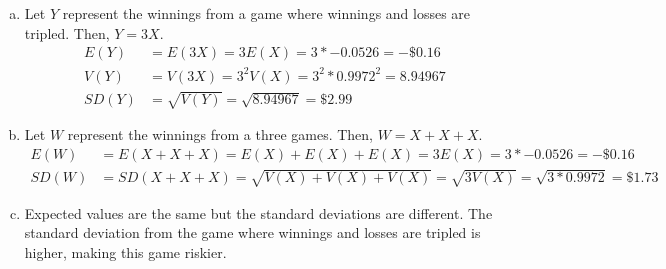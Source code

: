 \pagebreak

{
\begin{enumerate}[(a)]
\setlength{\itemsep}{0mm}
\item Let $Y$ represent the winnings from a game where winnings and losses are tripled. Then, $Y = 3X$.
\begin{align*}
E(Y) &= E(3X) = 3 E(X) = 3 * -0.0526 = -\$0.16 \\
V(Y) &= V(3X) = 3^2 V(X) = 3^2 * 0.9972^2 = 8.94967 \\
SD(Y) &= \sqrt{V(Y)} = \sqrt{8.94967} = \$2.99
\end{align*}
\item Let $W$ represent the winnings from a three games. Then, $W = X + X + X$.
\begin{align*}
E(W) &= E(X + X + X) = E(X) +E(X) + E(X) = 3 E(X) = 3 * -0.0526 = -\$0.16 \\
SD(W) &= SD(X + X + X) = \sqrt{V(X) + V(X) + V(X)} = \sqrt{3 V(X)} = \sqrt{3 * 0.9972} = \$1.73
\end{align*}
\item Expected values are the same but the standard deviations are different. The standard deviation from the game where winnings and losses are tripled is higher, making this game riskier.
\end{enumerate}
}


